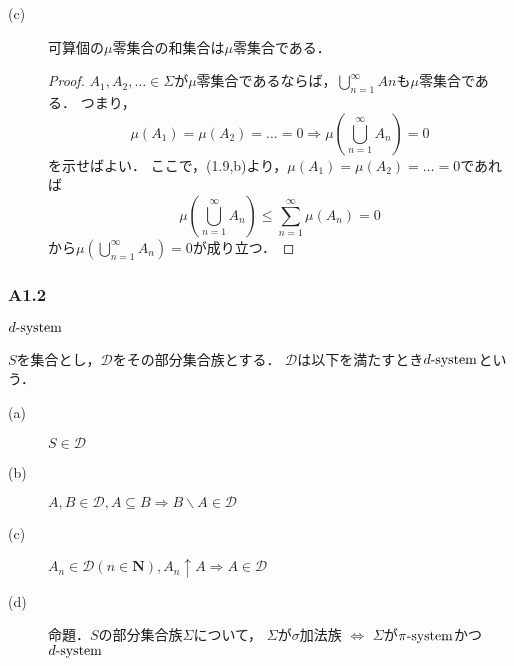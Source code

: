 \documentclass{jsarticle}
\begin{document}
\begin{description}
    \item[(c)] 可算個の$\mu$零集合の和集合は$\mu$零集合である．
        \begin{proof}
            $A_1,A_2,\dots\in\Sigma$が$\mu$零集合であるならば，$\bigcup_{n=1}^{\infty}An$も$\mu$零集合である．
            つまり，
            \begin{equation}
                \mu(A_1)=\mu(A_2)=\dots=0 \Rightarrow \mu(\bigcup_{n=1}^{\infty}A_n)=0   \nonumber 
            \end{equation}
            を示せばよい．
            ここで，(1.9,b)より，$\mu(A_1)=\mu(A_2)=\dots=0$であれば
            \begin{equation}
                \mu(\bigcup_{n=1}^{\infty}A_n) \leq \sum_{n=1}^{\infty}\mu(A_n)=0   \nonumber 
            \end{equation}
            から$\mu(\bigcup_{n=1}^{\infty}A_n)=0$が成り立つ．
        \end{proof}
    
\end{description}



\subsubsection*{A1.2}
$d{\rm \text{-}system}$

$S$を集合とし，$\mathcal{D}$をその部分集合族とする．
$\mathcal{D}$は以下を満たすとき$d{\rm \text{-}system}$という．
\begin{description}
    \item[(a)] $S\in\mathcal{D}$
    \item[(b)] $A,B\in\mathcal{D} , A\subseteq B \Longrightarrow B\backslash A\in\mathcal{D}$
    \item[(c)] $A_n\in\mathcal{D}(n\in\mathbf{N}) , A_n\uparrow A \Longrightarrow A\in\mathcal{D}$
    \item[(d)] 命題．$S$の部分集合族$\Sigma$について，
        $\Sigma$が$\sigma$加法族 $\Longleftrightarrow$ $\Sigma$が$\pi{\rm \text{-}system}$かつ$d{\rm \text{-}system}$
\end{description}
\end{document}
